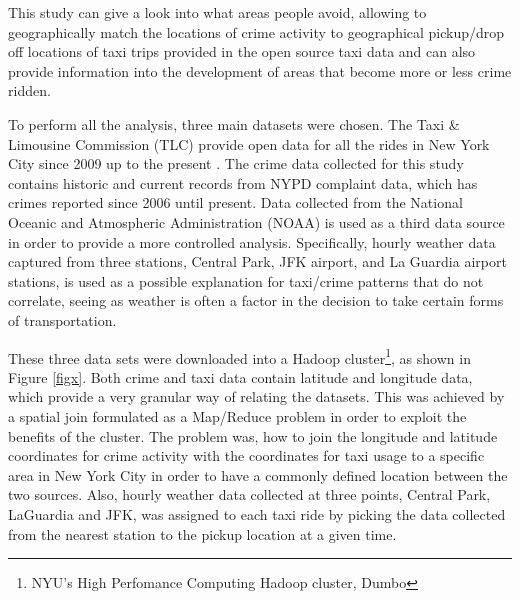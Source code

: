 \documentclass{sigkddExp}
\begin{document}

This study can give a look into what areas people avoid, allowing to geographically match the locations of crime activity to geographical pickup/drop off locations of taxi trips provided in the open source taxi data and can also provide information into the development of areas that become more or less crime ridden. 

To perform all the analysis, three main datasets were chosen.
The Taxi \& Limousine Commission (TLC) provide open data for all the rides in New York City since 2009 up to the present \cite{Taxi}. 
The crime data collected for this study contains historic \cite{NYPDHis} and current \cite{NYPDCur} records from NYPD complaint data, which has crimes reported since 2006 until present.
Data collected from the National Oceanic and Atmospheric Administration (NOAA) \cite{NOAA} is used as a third data source in order to provide a more controlled analysis. Specifically, hourly weather data  captured from three stations, Central Park, JFK airport, and La Guardia airport stations, is used as a possible explanation for taxi/crime patterns that do not correlate, seeing as weather is often a factor in the decision to take certain forms of transportation.


These three data sets were downloaded into a Hadoop cluster\footnote{NYU's High Perfomance Computing Hadoop cluster, Dumbo}, as shown in Figure \ref{figx}. Both crime and taxi data contain latitude and longitude data, which provide a very granular way of relating the datasets. 
This was achieved by a spatial join formulated as a Map/Reduce problem in order to exploit the benefits of the cluster. 
The problem was, how to join the  longitude and latitude coordinates for crime activity with the coordinates for taxi usage to a specific area  in New York City   in order to have a commonly defined location between the two sources.
Also, hourly weather data collected at three points, Central Park, LaGuardia and JFK, was assigned to each taxi ride by picking the data collected from the nearest station to the pickup location at a given time. 
\end{document}
